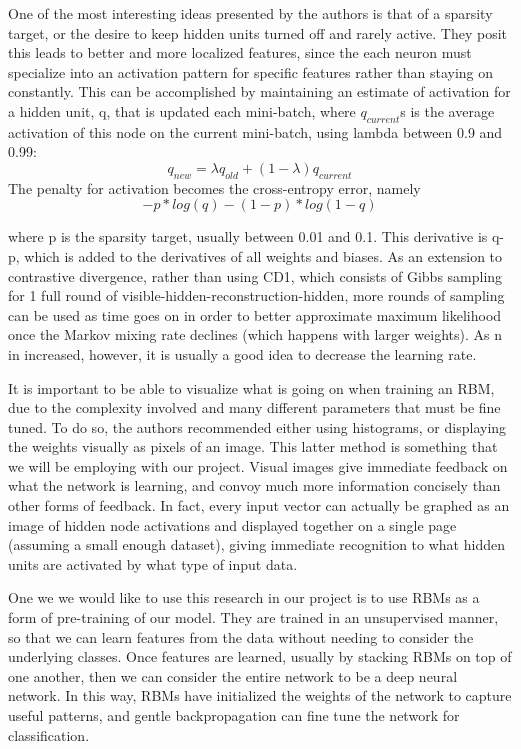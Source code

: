 \documentclass[12pt]{article}  %
\begin{document}
One of the most interesting ideas presented by the authors is that of a sparsity target, or the desire to keep hidden units turned off and rarely active.  They posit this leads to better and more localized features, since the each neuron must specialize into an activation pattern for specific features rather than staying on constantly.  This can be accomplished by maintaining an estimate of activation for a hidden unit, q, that is updated each mini-batch, where $q_{current}$s is the average activation of this node on the current mini-batch, using lambda between 0.9 and 0.99:
\[
q_{new} = \lambda q_{old} + (1 - \lambda)q_{current}
\]
The penalty for activation becomes the cross-entropy error, namely 
\[
 −p*log(q) - (1 - p)*log(1 - q) 
\]

where p is the sparsity target, usually between 0.01 and 0.1.  This derivative is q-p, which is added to the derivatives of all weights and biases.  As an extension to contrastive divergence, rather than using CD1, which consists of Gibbs sampling for 1 full round of visible-hidden-reconstruction-hidden, more rounds of sampling can be used as time goes on in order to better approximate maximum likelihood once the Markov mixing rate declines (which happens with larger weights).  As n in increased, however, it is usually a good idea to decrease the learning rate.  

It is important to be able to visualize what is going on when training an RBM, due to the complexity involved and many different parameters that must be fine tuned.  To do so, the authors recommended either using histograms, or displaying the weights visually as pixels of an image.  This latter method is something that we will be employing with our project.  Visual images give immediate feedback on what the network is learning, and convoy much more information concisely than other forms of feedback.  In fact, every input vector can actually be graphed as an image of hidden node activations and displayed together on a single page (assuming a small enough dataset), giving immediate recognition to what hidden units are activated by what type of input data.  

One we we would like to use this research in our project is to use RBMs as a form of pre-training of our model.  They are trained in an unsupervised manner, so that we can learn features from the data without needing to consider the underlying classes.  Once features are learned, usually by stacking RBMs on top of one another, then we can consider the entire network to be a deep neural network.  In this way, RBMs have initialized the weights of the network to capture useful patterns, and gentle backpropagation can fine tune the network for classification.
\end{document}
